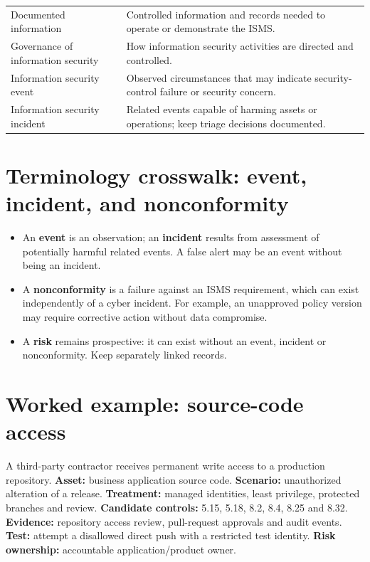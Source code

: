 \documentclass[11pt,letterpaper]{article}
\begin{document}
\begin{longtable}{>{\raggedright\arraybackslash}p{}>{\raggedright\arraybackslash}p{}}
Documented information & Controlled information and records needed to operate or demonstrate the ISMS.\\
Governance of information security & How information security activities are directed and controlled.\\
Information security event & Observed circumstances that may indicate security-control failure or security concern.\\
Information security incident & Related events capable of harming assets or operations; keep triage decisions documented.\\
\end{longtable}\normalsize

\section{Terminology crosswalk: event, incident, and nonconformity}
\begin{itemize}
\item An \textbf{event} is an observation; an \textbf{incident} results from assessment of potentially harmful related events. A false alert may be an event without being an incident.
\item A \textbf{nonconformity} is a failure against an ISMS requirement, which can exist independently of a cyber incident. For example, an unapproved policy version may require corrective action without data compromise.
\item A \textbf{risk} remains prospective: it can exist without an event, incident or nonconformity. Keep separately linked records.
\end{itemize}

\section{Worked example: source-code access}
A third-party contractor receives permanent write access to a production repository. \textbf{Asset:} business application source code. \textbf{Scenario:} unauthorized alteration of a release. \textbf{Treatment:} managed identities, least privilege, protected branches and review. \textbf{Candidate controls:} 5.15, 5.18, 8.2, 8.4, 8.25 and 8.32. \textbf{Evidence:} repository access review, pull-request approvals and audit events. \textbf{Test:} attempt a disallowed direct push with a restricted test identity. \textbf{Risk ownership:} accountable application/product owner.
\end{document}
